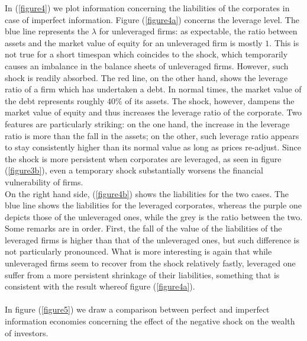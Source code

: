 \documentclass[11pt]{article}
\begin{document}
In (\ref{figure4}) we plot information concerning the liabilities of the corporates in case of imperfect information. Figure (\ref{figure4a}) concerns the leverage level. The blue line represents the $\lambda$ for unleveraged firms: as expectable, the ratio between assets and the market value of equity for an unleveraged firm is mostly $1$. This is not true for a short timespan which coincides to the shock, which temporarily causes an imbalance in the balance sheets of unleveraged firms. However, such shock is readily absorbed. The red line, on the other hand, shows the leverage ratio of a firm which has undertaken a debt. In normal times, the market value of the debt represents roughly $40\%$ of its assets. The shock, however, dampens the market value of equity and thus increases the leverage ratio of the corporate. Two features are particularly striking: on the one hand, the increase in the leverage ratio is more than the fall in the assets; on the other, such leverage ratio appears to stay consistently higher than its normal value as long as prices re-adjust. Since the shock is more persistent when corporates are leveraged, as seen in figure (\ref{figure3b}), even a temporary shock substantially worsens the financial vulnerability of firms.\\
On the right hand side, (\ref{figure4b}) shows the liabilities for the two cases. The blue line shows the liabilities for the leveraged corporates, whereas the purple one depicts those of the unleveraged ones, while the grey is the ratio between the two. Some remarks are in order. First, the fall of the value of the liabilities of the leveraged firms is higher than that of the unleveraged ones, but such difference is not particularly pronounced. What is more interesting is again that while unleveraged firms seem to recover from the shock relatively fastly, leveraged one suffer from a more persistent shrinkage of their liabilities, something that is consistent with the result whereof figure (\ref{figure4a}).\\\\
In figure (\ref{figure5}) we draw a comparison between perfect and imperfect information economies concerning the effect of the negative shock on the wealth of investors.
\end{document}
